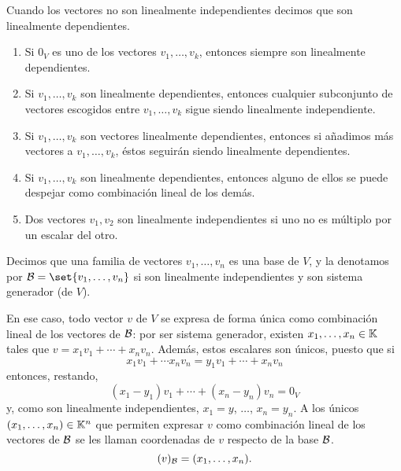 Cuando los vectores no son linealmente independientes decimos que son linealmente dependientes.
\begin{remark}
	\begin{enumerate}
		\item Si \(0_V \) es uno de los vectores \(v_1, \ldots, v_k \), entonces siempre son linealmente dependientes.
		\item Si \(v_1, \ldots, v_k \) son linealmente dependientes, entonces cualquier subconjunto de vectores escogidos entre \(v_1, \ldots, v_k \) sigue siendo linealmente independiente.
		\item Si \(v_1, \ldots, v_k \) son vectores linealmente dependientes, entonces si añadimos más vectores a \(v_1, \ldots, v_k \), éstos seguirán siendo linealmente dependientes.
		\item Si \(v_1, \ldots, v_k \) son linealmente dependientes, entonces alguno de ellos se puede despejar como combinación lineal de los demás.
		\item Dos vectores \(v_1, v_2 \) son linealmente independientes si uno no es múltiplo por un escalar del otro.
	\end{enumerate}
\end{remark}
\begin{definition}[Base]
	Decimos que una familia de vectores \(v_1, \ldots, v_n \) es una base de \(V \), y la denotamos por \(\mathcal{\MakeUppercase{b}} = \set{v_1,\ldots, v_n }\) si son linealmente independientes y son sistema generador (de \(V \)).
\end{definition}
En ese caso, todo vector \(v \) de \(V \) se expresa de forma única como combinación lineal de los vectores de \(\mathcal{\MakeUppercase{b}}\): por ser sistema generador, existen \(x_1, \ldots, x_n \in \mathbb{K} \) tales que \(v = x_1 v_1 + \cdots + x_n v_n\). Además, estos escalares son únicos, puesto que si
\[
	x_1 v_1 + \cdots x_n v_n = y_1 v_1 + \cdots + x_n v_n
\]
entonces, restando,
\[
	(x_1 - y_1) v_1 + \cdots + (x_n - y_n)v_n = 0_V
\]
y, como son linealmente independientes, \(x_1 = y \), \(\ldots \), \(x_n  = y_n \). A los únicos \((x_1, \ldots, x_n) \in \mathbb{K}^{n } \) que permiten expresar \(v \) como combinación lineal de los vectores de \(\mathcal{\MakeUppercase{b}}\) se les llaman coordenadas de \(v \) respecto de la base \(\mathcal{\MakeUppercase{b}}\).
\[
	(v)_{\mathcal{\MakeUppercase{b}}} = (x_1, \ldots, x_n).
\]
